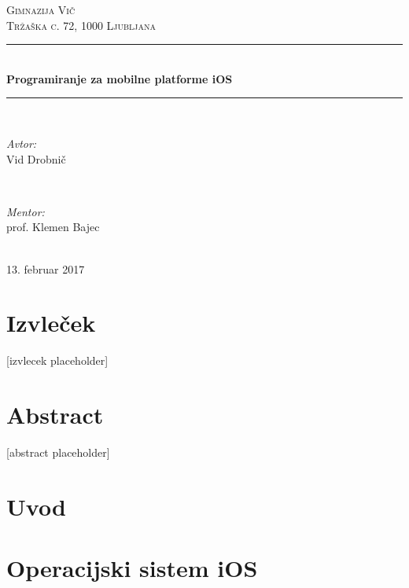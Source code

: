 \documentclass[a4paper, 12pt]{article}
\begin{document}
	\begin{titlepage}
		\newcommand{\HRule}{\rule{\linewidth}{0.5mm}}
		\center
	
		\textsc{\LARGE Gimnazija Vič}\\[0.5cm]
		\textsc{\Large Tržaška c. 72, 1000 Ljubljana}\\[1.5cm]

		\HRule \\[0.4cm]
		{ \huge \bfseries Programiranje za mobilne platforme iOS}\\[0.4cm]
		\HRule \\[1.5cm]
		
		\begin{minipage}{0.4\textwidth}
			\begin{flushleft} \large
				\emph{Avtor:}\\
				Vid Drobnič
			\end{flushleft}
		\end{minipage}
		~
		\begin{minipage}{0.4\textwidth}
			\begin{flushright} \large
				\emph{Mentor:} \\
				prof. Klemen Bajec
			\end{flushright}
		\end{minipage}\\[4cm]
		
		{\large 13. februar 2017}\\[3cm]
		\vfill
	\end{titlepage}
	
	\section*{Izvleček}
	[izvlecek placeholder]
	
	\section*{Abstract}
	[abstract placeholder]
	
	\pagebreak
	
	\tableofcontents
	\pagebreak
	
	\section{Uvod}
	
	
	\section{Operacijski sistem iOS}
	
	
\end{document}
